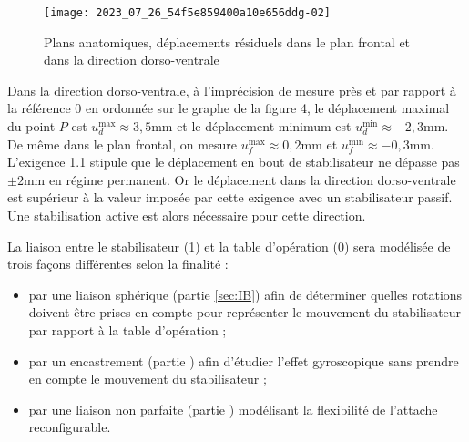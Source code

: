\begin{figure}[!h]
\centering
\texttt{[image: 2023\_07\_26\_54f5e859400a10e656ddg-02]}
\caption{Plans anatomiques, déplacements résiduels dans le plan frontal et dans la direction dorso-ventrale\label{fig_ccspsi2022:04}}
\end{figure}


\ifprof
\begin{corrige}
Dans la direction dorso-ventrale, à l'imprécision de mesure près et par rapport à la référence 0 en ordonnée sur le graphe de la figure 4, le déplacement maximal du point $P$ est $u_d^{\text{max}} \approx 3,5$mm et le déplacement minimum est  $u_d^{\text{min}} \approx -2,3$mm.\\

De même dans le plan frontal, on mesure $u_f^{\text{max}} \approx 0,2$mm et $u_f^{\text{min}} \approx -0,3$mm.\\

L'exigence 1.1 stipule que le déplacement en bout de stabilisateur ne dépasse pas $\pm 2$mm en régime permanent. Or le déplacement dans la direction dorso-ventrale est supérieur à la valeur imposée par cette exigence avec un stabilisateur passif. Une stabilisation active est alors nécessaire pour cette direction.
\end{corrige}
\else
\fi


La liaison entre le stabilisateur (1) et la table d'opération (0) sera modélisée de trois façons différentes selon la finalité :

\begin{itemize}
  \item par une liaison sphérique (partie \ref{sec:IB}) afin de déterminer quelles rotations doivent être prises en compte pour représenter le mouvement du stabilisateur par rapport à la table d'opération ;
  \item par un encastrement (partie \label{sec:IIA}) afin d'étudier l'effet gyroscopique sans prendre en compte le mouvement du stabilisateur ;
  \item par une liaison non parfaite (partie \label{sec:IIC}) modélisant la flexibilité de l'attache reconfigurable.
\end{itemize}

